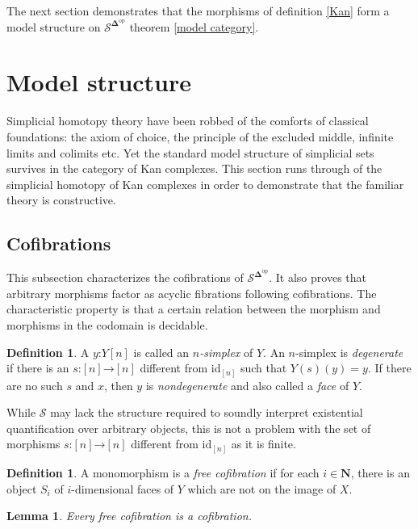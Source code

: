 \documentclass{amsart}
\theoremstyle{plain}
\newtheorem{lemma}[theorem]{Lemma}
\theoremstyle{definition}
\newtheorem{defin}[theorem]{Definition}
\newcommand\cat\mathcal
\newcommand\id{\mathrm{id}}
\newcommand\nno{\mathbf N}
\newcommand\dual{^{\mathrm{op}}}
\newcommand\simCat{\mathbf\Delta}
\newcommand\s{^{\simCat\dual}}
\newcommand\of{\mathord:}
\renewcommand\to{\mathord\rightarrow}
\begin{document}
The next section demonstrates that the morphisms of definition \ref{Kan} form a model structure on $\cat S\s$ theorem \ref{model category}.

\section{Model structure}
Simplicial homotopy theory have been robbed of the comforts of classical foundations: the axiom of choice, the principle of the excluded middle, infinite limits and colimits etc. Yet the standard model structure of simplicial sets survives in the category of Kan complexes. This section runs through of the simplicial homotopy of Kan complexes \cite{Hovey99,GJSHT} in order to demonstrate that the familiar theory is constructive.

\subsection{Cofibrations}
This subsection characterizes the cofibrations of $\cat S\s$. It also proves that arbitrary morphisms factor as acyclic fibrations following cofibrations. The characteristic property is that a certain relation between the morphism and morphisms in the codomain is decidable.

\begin{defin} A $y\of Y[n]$ is called an \emph{$n$-simplex} of $Y$. An $n$-simplex is \emph{degenerate} if there is an $s\of [n]\to [n]$ different from $\id_{[n]}$ such that $Y(s)(y)=y$. If there are no such $s$ and $x$, then $y$ is \emph{nondegenerate} and also called a \emph{face} of $Y$.\end{defin}

While $\cat S$ may lack the structure required to soundly interpret existential quantification over arbitrary objects, this is not a problem with the set of morphisms $s\of [n]\to [n]$ different from $\id_{[n]}$ as it is finite.

\begin{defin} A monomorphism is a \emph{free cofibration} if for each $i\in \nno$, there is an object $S_i$ of $i$-dimensional faces of $Y$ which are not on the image of $X$.
\end{defin}

\begin{lemma} Every free cofibration is a cofibration. \label{Reedy}
\end{lemma}
\end{document}
